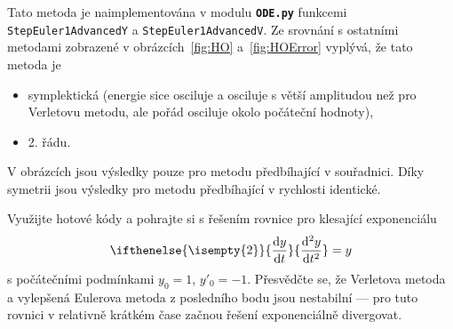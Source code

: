 \documentclass[a4paper,11pt,twoside]{article}
\renewcommand{\d}{\mathrm{d}}
\newcommand{\derivative}[3][]{\ifthenelse{\isempty{#1}}	    %
	{\frac{\d{#2}}{\d{#3}}}
	{\frac{\d^{#1}{#2}}{\d{#3}^{#1}}}
}
\def\code#1{\textnormal{\texttt{#1}}}
\def\file#1{\textnormal{\textbf{\texttt{#1}}}}
\begin{document}
    \begin{solution}
        Tato metoda je naimplementována v modulu \file{ODE.py} funkcemi \code{StepEuler1AdvancedY} a \code{StepEuler1AdvancedV}.
        Ze srovnání s ostatními metodami zobrazené v obrázcích~\ref{fig:HO} a~\ref{fig:HOError} vyplývá, že tato metoda je
        \begin{itemize}
        \item symplektická (energie sice osciluje a osciluje s větší amplitudou než pro Verletovu metodu, ale pořád osciluje okolo počáteční hodnoty),
        \item 2. řádu.
        \end{itemize}
        V obrázcích jsou výsledky pouze pro metodu předbíhající v souřadnici. 
        Díky symetrii jsou výsledky pro metodu předbíhající v rychlosti identické.
    \end{solution}

    \begin{task}
        Využijte hotové kódy a pohrajte si s řešením rovnice pro klesající exponenciálu
        \begin{equation}\label{eq:Exp}
            \derivative[2]{y}{t}=y
        \end{equation}
        s počátečními podmínkami $y_{0}=1$, $y'_{0}=-1$.
        Přesvědčte se, že Verletova metoda a vylepšená Eulerova metoda z posledního bodu jsou nestabilní --- pro tuto rovnici v relativně krátkém čase začnou řešení exponenciálně divergovat.
    \end{task}
\end{document}
